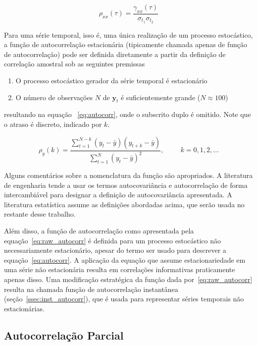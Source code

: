 $$\rho_{xx}(\tau) =\frac{\gamma_{xx}(\tau)}{\sigma_{t_1}\sigma_{t_2}}$$

Para uma série temporal, isso é, uma única  realização de um processo
estocástico, a função de autocorrelação estacionária (tipicamente chamada
apenas de função de autocorrelação) pode ser definida diretamente a partir da
definição de correlação amostral sob as seguintes premissas

\begin{enumerate}
    \item O processo estocástico gerador da série temporal é estacionário
    \item O número de observações  $N$ de $\mathbf{y}_t$ é suficientemente
    grande ($N \approx 100$)
\end{enumerate}

resultando na equação ~\ref{eq:autocorr}, onde o subscrito duplo é omitido.
Note que o atraso é discreto, indicado por $k$.

\vspace{1cm}

\begin{equation}\label{eq:autocorr}
    \rho_y(k) = \frac{\sum_{t=1}^{N-k}(y_t - \bar{y})(y_{t+k}-\bar{y})}{\sum_{t=1}^{N}(y_t - \bar{y})^2}  , \hspace{1cm} k = 0, 1, 2, \dots
\end{equation}

Alguns comentários sobre a nomenclatura da função são apropriados. A literatura
de engenharia tende a usar os termos autocovariância e autocorrelação de forma
intercambiável para designar a definição de autocovariância apresentada. A
literatura estatística assume as definições abordadas acima, que serão usada no
restante desse trabalho.

Além disso, a função de autocorrelação como apresentada pela
equação~\ref{eq:raw_autocorr} é definida para um processo estocástico não
necessariamente estacionário, apesar do termo ser usado para descrever a
equação~\ref{eq:autocorr}. A aplicação da equação que assume estacionariedade
em uma série não estacionária resulta em correlações informativas praticamente
apenas disso. Uma modificação estratégica da função dada
por~\ref{eq:raw_autocorr} resulta na chamada função de autocorrelação
instantânea (seção~\ref{ssec:inst_autocorr}), que é usada para representar
séries temporais não estacionárias.

\vspace{1cm}

\subsection{Autocorrelação Parcial}\label{ssec:partial_acorr}

